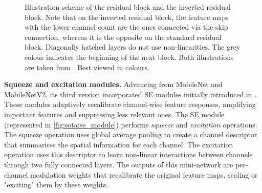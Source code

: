 \begin{figure}[htbp]
  \centering
  \caption{Illustration scheme of the residual block and the inverted residual
    block. Note that on the inverted residual block, the feature maps with the lower
    channel count are the ones connected via the skip connection, whereas it is the
    opposite on the standard residual block. Diagonally hatched layers do not use
    non-linearities. The grey colour indicates the beginning of the next block. Both
    illustrations are taken from \cite{DongMobileNetV2}. Best viewed in colours.}
  \label{fig:sota:inverted_vs_residual_blocks}
\end{figure}


\noindent\textbf{Squeeze and excitation modules.} Advancing from MobileNet and
MobileNetV2, its third version \cite{DBLP:conf/iccv/HowardPALSCWCTC19}
incorporated \ac{SE} modules initially introduced in
\cite{DBLP:conf/cvpr/HuSS18}. These modules adaptively recalibrate channel-wise
feature responses, amplifying important features and suppressing less relevant
ones. The \ac{SE} module (represented in \cref{fig:sota:se_module}) performs
\emph{squeeze} and \emph{excitation} operations. The squeeze operation uses
global average pooling to create a channel descriptor that summarises the
spatial information for each channel. The excitation operation uses this
descriptor to learn non-linear interactions between channels through two fully
connected layers. The outputs of this mini-network are per-channel modulation
weights that recalibrate the original feature maps, scaling or "exciting" them
by these weights.\\

